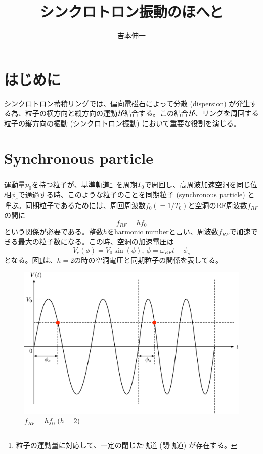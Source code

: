 \documentclass[10pt,a4paper]{ltjsarticle}
\begin{document}
\title{シンクロトロン振動のほへと}
\author{吉本伸一}
\maketitle
\tableofcontents
\clearpage

\section{はじめに}
シンクロトロン蓄積リングでは、偏向電磁石によって分散 (dispersion) が発生する為、粒子の横方向と縦方向の運動が結合する。この結合が、リングを周回する粒子の縦方向の振動 (シンクロトロン振動) において重要な役割を演じる。

\section{Synchronous particle}
運動量$p_0$を持つ粒子が、基準軌道\footnote{粒子の運動量に対応して、一定の閉じた軌道 (閉軌道) が存在する。}\ を周期$T_0$で周回し、高周波加速空洞を同じ位相$\phi_s$で通過する時、このような粒子のことを同期粒子 (synchronous particle) と呼ぶ。同期粒子であるためには、周回周波数$f_0 (= 1/T_0)$と空洞のRF周波数$f_{RF}$の間に
%
\begin{equation}
    f_{RF} = h f_0
    \label{harmonic}
\end{equation}
%
という関係が必要である。整数$h$をharmonic numberと言い、周波数$f_{RF}$で加速できる最大の粒子数になる。この時、空洞の加速電圧は
%
\begin{equation}
    V_c (\phi) = V_0 \sin (\phi),\:\phi = \omega_{RF} t + \phi_s
\end{equation}
%
となる。図\ref{synchronous}は、$h=2$の時の空洞電圧と同期粒子の関係を表してる。

\begin{figure}[hbt]
    \begin{center}
      \includegraphics[width=15cm,clip]{synchronous.pdf}
      \caption{$f_{RF} = h f_0$ ($h=2$)}
      \label{synchronous}
    \end{center}
\end{figure}
\end{document}
